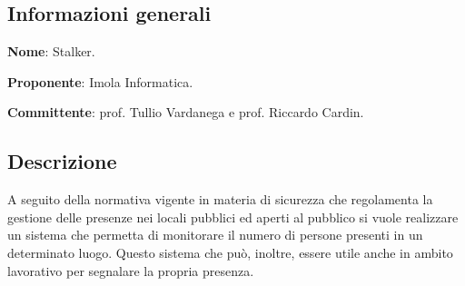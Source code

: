 \documentclass[../studio-di-fattibilita.tex]{subfiles}
\begin{document}
\subsection{Informazioni generali}%
\label{sub:informazioni_generale}
\begin{description}
  \item \textbf{Nome}: Stalker.
  \item \textbf{Proponente}: Imola Informatica.
  \item \textbf{Committente}: prof. Tullio Vardanega e prof. Riccardo Cardin.
\end{description}

\subsection{Descrizione}%
\label{sub:descrizione}
A seguito della normativa vigente in materia di sicurezza che regolamenta la gestione delle presenze nei locali pubblici ed aperti al pubblico si vuole realizzare un sistema che permetta di monitorare il numero di persone presenti in un determinato luogo. Questo sistema che può, inoltre, essere utile anche in ambito lavorativo per segnalare la propria presenza.
\end{document}
